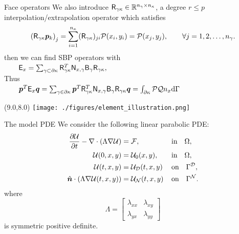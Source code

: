 \documentclass{beamer}
\begin{document}
\begin{frame} {Face operators}
    We also introduce $\mathsf{R}_{\gamma\kappa} \in \mathbb{R}^{n_\gamma \times n_\kappa}$, a degree $r \le p$ interpolation/extrapolation operator which satisfies
    \begin{equation*}
    \left(\mathsf{R}_{\gamma\kappa} \bm{p}_{k}\right)_{j} = 
    \sum_{i=1}^{n_{\kappa}} (\mathsf{R}_{\gamma\kappa})_{ji} \mathcal{P}(x_{i},y_{i}) 
    = \mathcal{P}(x_{j},y_{j}),
    \qquad\forall j=1,2,\ldots,n_{\gamma}.
    \end{equation*}
    then we can find SBP operators with \\ \vskip 3mm
$\qquad
    \mathsf{E}_{x} = \sum_{\gamma \subset \partial \kappa} \mathsf{R}_{\gamma\kappa}^{T} \mathsf{N}_{x,\gamma} \mathsf{B}_{\gamma} \mathsf{R}_{\gamma\kappa},
$\\ \vskip 3mm
    Thus \\ \vskip 2mm
$\qquad
    \bm{p}^T \mathsf{E}_{x} \bm{q} = \sum_{\gamma \in \partial\kappa} \bm{p}^T \mathsf{R}_{\gamma\kappa}^T\mathsf{N}_{x,\gamma}\mathsf{B}_{\gamma}\mathsf{R}_{\gamma\kappa}\bm{q} = \int_{\partial\kappa}\mathcal{P}\mathcal{Q} n_x\mathrm{d} \Gamma
$
    
    \begin{textblock}{5.55}(9.0,8.0)
        \texttt{[image: ./figures/element\_illustration.png]}
    \end{textblock}
    
\end{frame}

\begin{frame}{The model PDE}
    We consider the following linear parabolic PDE:
    \begin{equation*}\label{eq:parabolic}
    \begin{aligned}
    \frac{\partial \mathcal{U}}{\partial{t}}- \nabla\cdot\left( \Lambda \nabla \mathcal{U} \right) &= \mathcal{F},\quad &&\text{in} \quad\Omega, \\
    \mathcal{U}(0,x,y)&=\mathcal{U}_{0}(x,y), \quad &&\text{in} \quad\Omega, \\
    \mathcal{U}(t,x,y) &= \mathcal{U}_{\mathcal{D}}(t,x,y) &&\text{on} \quad\Gamma^{\mathcal{D}}, \\
    \hat{\bm{n}} \cdot \left( \Lambda \nabla \mathcal{U}(t,x,y)\right) &= \mathcal{U}_{\mathcal{N}}(t,x,y)
    &&\text{on} \quad \Gamma^{\mathcal{N}}. \\
    \end{aligned}
    \end{equation*}
    where
    \begin{equation*}
    \Lambda = \begin{bmatrix}
    \lambda_{xx} & \lambda_{xy} \\ \lambda_{yx} & \lambda_{yy}
    \end{bmatrix}
    \end{equation*}
    is symmetric positive definite.
\end{frame}
\end{document}
